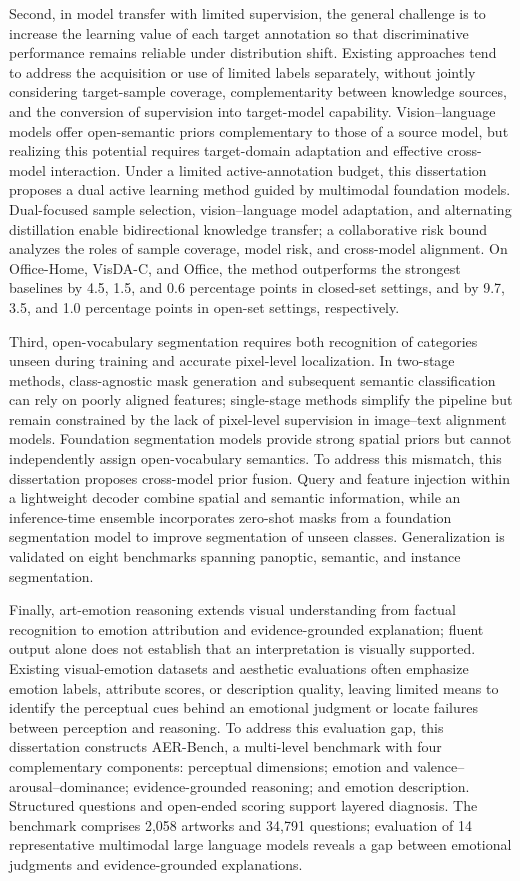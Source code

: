 \begin{eabstract}
Second, in model transfer with limited supervision, the general challenge is to increase the learning value of each target annotation so that discriminative performance remains reliable under distribution shift. Existing approaches tend to address the acquisition or use of limited labels separately, without jointly considering target-sample coverage, complementarity between knowledge sources, and the conversion of supervision into target-model capability. Vision--language models offer open-semantic priors complementary to those of a source model, but realizing this potential requires target-domain adaptation and effective cross-model interaction. Under a limited active-annotation budget, this dissertation proposes a dual active learning method guided by multimodal foundation models. Dual-focused sample selection, vision--language model adaptation, and alternating distillation enable bidirectional knowledge transfer; a collaborative risk bound analyzes the roles of sample coverage, model risk, and cross-model alignment. On Office-Home, VisDA-C, and Office, the method outperforms the strongest baselines by 4.5, 1.5, and 0.6 percentage points in closed-set settings, and by 9.7, 3.5, and 1.0 percentage points in open-set settings, respectively.
  
Third, open-vocabulary segmentation requires both recognition of categories unseen during training and accurate pixel-level localization. In two-stage methods, class-agnostic mask generation and subsequent semantic classification can rely on poorly aligned features; single-stage methods simplify the pipeline but remain constrained by the lack of pixel-level supervision in image--text alignment models. Foundation segmentation models provide strong spatial priors but cannot independently assign open-vocabulary semantics. To address this mismatch, this dissertation proposes cross-model prior fusion. Query and feature injection within a lightweight decoder combine spatial and semantic information, while an inference-time ensemble incorporates zero-shot masks from a foundation segmentation model to improve segmentation of unseen classes. Generalization is validated on eight benchmarks spanning panoptic, semantic, and instance segmentation.
  
Finally, art-emotion reasoning extends visual understanding from factual recognition to emotion attribution and evidence-grounded explanation; fluent output alone does not establish that an interpretation is visually supported. Existing visual-emotion datasets and aesthetic evaluations often emphasize emotion labels, attribute scores, or description quality, leaving limited means to identify the perceptual cues behind an emotional judgment or locate failures between perception and reasoning. To address this evaluation gap, this dissertation constructs AER-Bench, a multi-level benchmark with four complementary components: perceptual dimensions; emotion and valence--arousal--dominance; evidence-grounded reasoning; and emotion description. Structured questions and open-ended scoring support layered diagnosis. The benchmark comprises 2{,}058 artworks and 34{,}791 questions; evaluation of 14 representative multimodal large language models reveals a gap between emotional judgments and evidence-grounded explanations.
  

\end{eabstract}
